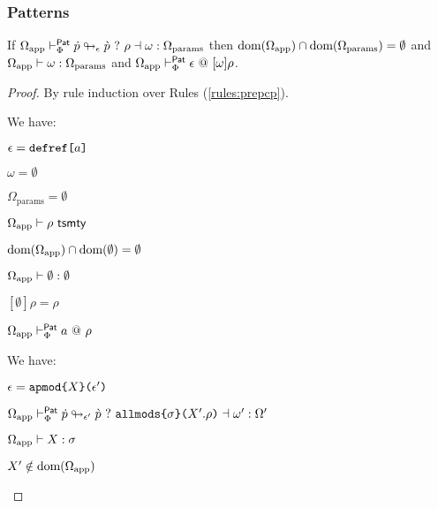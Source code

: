\subsubsection{Patterns}
\begin{lemma}
\label{lemma:pattern-deparameterization-P}
If $\Omega_\text{app} \vdash_{\Phi}^\mathsf{Pat} \dot{p} \looparrowright_{\epsilon} \grave{p} ~?~ \rho \dashv \omega : \Omega_\text{params}$ then $\text{dom}(\Omega_\text{app}) \cap \text{dom}(\Omega_\text{params}) = \emptyset$ and $\Omega_\text{app} \vdash \omega : \Omega_\text{params}$ and $\Omega_\text{app} \vdash_{\Phi}^{\mathsf{Pat}} \epsilon ~@~ [\omega]\rho$. 
\end{lemma}
\begin{proof} By rule induction over Rules (\ref{rules:prepcp}).
\begin{byCases}
  \item[\text{(\ref{rule:prepcp-cepat})}] We have:
    \begin{pfsteps*}
      \item $\epsilon=\texttt{defref}\texttt{[}a\texttt{]}$ 
      \item $\omega=\emptyset$ 
      \item $\Omega_\text{params}=\emptyset$ 
      \item $\Omega_\text{app} \vdash \rho~\mathsf{tsmty}$  
      \item $\text{dom}(\Omega_\text{app}) \cap \text{dom}(\emptyset) = \emptyset$ 
      \item $\Omega_\text{app} \vdash \emptyset : \emptyset$ 
      \item $[\emptyset]\rho=\rho$ 
      \item $\Omega_\text{app} \vdash_{\Phi}^{\mathsf{Pat}} a ~@~ \rho$ 
    \end{pfsteps*}
    \resetpfcounter
  \item[\text{(\ref{rule:prepcp-allmods})}] We have:
    \begin{pfsteps*}
      \item $\epsilon=\texttt{apmod}\texttt{\{}X\texttt{\}(}\epsilon'\texttt{)}$ 
      \item $\Omega_\text{app} \vdash_{\Phi}^\mathsf{Pat} \dot{p} \looparrowright_{\epsilon'} \grave{p} ~?~ \texttt{allmods}\texttt{\{}\sigma\texttt{\}(}X'.\rho\texttt{)} \dashv \omega' : \Omega'$  
      \item $\Omega_\text{app} \vdash X : \sigma$  
      \item $X' \notin \text{dom}(\Omega_\text{app})$  

\end{pfsteps*}
\end{byCases}
\end{proof}
